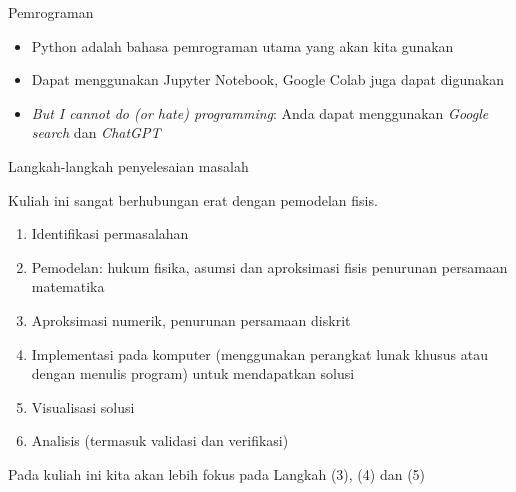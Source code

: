 \begin{frame}{Pemrograman}

\begin{itemize}
\item Python adalah bahasa pemrograman utama yang akan kita gunakan
\item Dapat menggunakan Jupyter Notebook, Google Colab juga dapat digunakan
\item \textit{But I cannot do (or hate) programming}:
Anda dapat menggunakan \textit{Google search} dan \textit{ChatGPT}
\end{itemize}

\end{frame}



\begin{frame}{Langkah-langkah penyelesaian masalah}

Kuliah ini sangat berhubungan erat dengan pemodelan fisis.

\begin{enumerate}[(1)]
\item Identifikasi permasalahan
\item Pemodelan: hukum fisika, asumsi dan aproksimasi fisis penurunan
  persamaan matematika
\item Aproksimasi numerik, penurunan persamaan diskrit
\item Implementasi pada komputer (menggunakan perangkat lunak khusus atau
  dengan menulis program) untuk mendapatkan solusi
\item Visualisasi solusi
\item Analisis (termasuk validasi dan verifikasi)
\end{enumerate}

Pada kuliah ini kita akan lebih fokus pada Langkah (3), (4) dan (5)
\end{frame}




